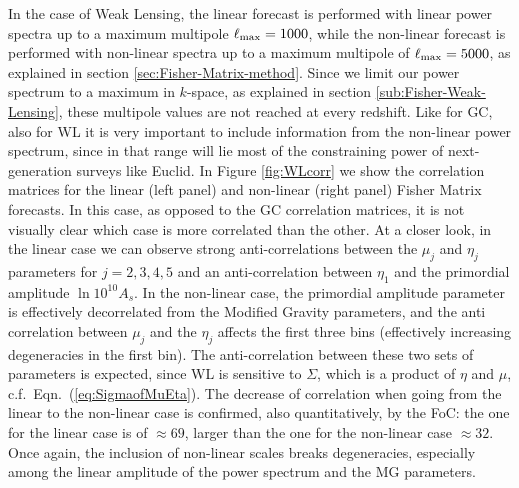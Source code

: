 In the case of Weak Lensing, the linear forecast is performed with
linear power spectra up to a maximum multipole $\ell_{\rm max}=1000$,
while the non-linear forecast is performed with non-linear spectra
up to a maximum multipole of $\ell_{\rm max}=5000$, as explained in
section \ref{sec:Fisher-Matrix-method}. Since we limit 
our power spectrum to a maximum in $k$-space, as explained
in section \ref{sub:Fisher-Weak-Lensing}, these multipole values are not reached at every redshift.
Like for GC, also for WL it is very important
to include information from the non-linear power spectrum, since in
that range will lie most of the constraining power of next-generation
surveys like Euclid. In Figure \ref{fig:WLcorr} we show the correlation
matrices for the linear (left panel) and non-linear (right panel)
Fisher Matrix forecasts. In this case, as opposed to the GC correlation matrices, it is not visually 
clear which case is more correlated than the other.
At a closer look, in the linear case we can observe strong anti-correlations between the $\mu_{j}$ and $\eta_{j}$ parameters for 
$j={2,3,4,5}$ and an anti-correlation between $\eta_{1}$ and the primordial amplitude $\ln10^{10}A_{s}$.
In the non-linear case, the primordial amplitude parameter is effectively decorrelated from the Modified Gravity parameters,
and the anti correlation between $\mu_{j}$ and the $\eta_{j}$ affects the first three bins (effectively increasing degeneracies in the first bin).
The anti-correlation between these two sets of parameters
is expected, since WL is sensitive to $\Sigma$, which is a product of $\eta$ and $\mu$, c.f.\ Eqn.\ (\ref{eq:SigmaofMuEta}).
The decrease of correlation when going from the linear to the non-linear case is confirmed, also quantitatively, by the FoC: the one for the linear case is of $\approx 69$, larger than the one for the non-linear case $\approx 32$. Once again, the inclusion of non-linear scales breaks degeneracies, especially among the linear amplitude of the power spectrum and the MG parameters. 

